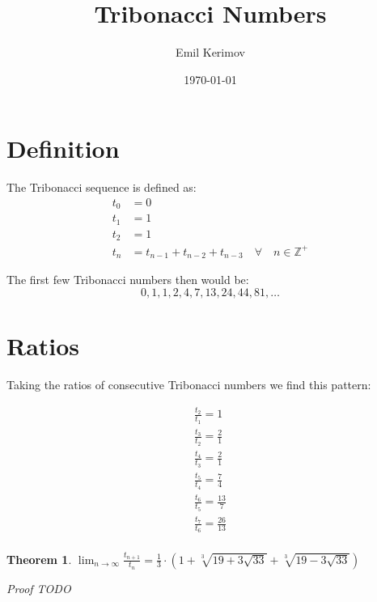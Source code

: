 \documentclass[a4paper]{article}
\title{Tribonacci Numbers}
\author{Emil Kerimov}
\date{\today}
\begin{document}
\maketitle

\newtheorem{theorem}{Theorem}[section]
\newtheorem{corollary}{Corollary}[theorem]
\newtheorem{lemma}[theorem]{Lemma}
\newtheorem{definition}{Definition}[section]

\section{Definition}\label{sec:definition}

The Tribonacci sequence is defined as:
\begin{equation}
\begin{aligned}
t_0 &= 0 \\
t_1 &= 1 \\
t_2 &= 1 \\
t_{n} &= t_{n-1} + t_{n-2} + t_{n-3} \quad \forall \quad n \in \mathbb{Z}^+
\end{aligned}\label{eq:equation2}
\end{equation}

The first few Tribonacci numbers then would be:
\[
0,1,1,2,4,7,13,24,44, 81, \dots
\]

\section{Ratios}\label{sec:basic_ratio}

Taking the ratios of consecutive Tribonacci numbers we find this pattern:

\begin{gather*}
\frac{t_{2}}{t_{1}} = 1 \\
\frac{t_{3}}{t_{2}} = \frac{2}{1}\\
\frac{t_{4}}{t_{3}} = \frac{2}{1}\\
\frac{t_{5}}{t_{4}} = \frac{7}{4}\\
\frac{t_{6}}{t_{5}} = \frac{13}{7}\\
\frac{t_{7}}{t_{6}} = \frac{26}{13}\\
\end{gather*}


\begin{theorem}
 $\lim_{n \to \infty} \frac{t_{n+1}}{t_{n}} = \frac{1}{3} \cdot \left( 1 + \sqrt[3]{19 + 3 \sqrt{33}} +
 \sqrt[3]{19 - 3 \sqrt{33}} \right) $

Proof
TODO
\end{theorem}
\end{document}
